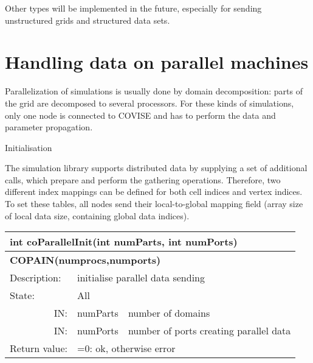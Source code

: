 \begin{htmlonly}
Other types will be implemented in the future, especially for sending unstructured grids and 
structured data sets.




\section{Handling data on parallel machines}
\latexonly
{}
\endlatexonly

Parallelization of simulations is usually done by domain decomposition: parts of the grid are decomposed to several processors. For these kinds of
simulations, only one node is connected to COVISE and has to perform the data and parameter propagation.

\vspace*{1cm}
{\Large Initialisation}
\vspace*{0.5cm}

The simulation library supports distributed data by supplying a set of additional calls, which prepare and perform the gathering operations. Therefore,
two different index mappings can be defined for both cell indices and vertex indices. To set these tables, all nodes send their local-to-global mapping
field (array size of local data size, containing global data indices).


\begin{longtable}{|p{4cm}|p{2.5cm}|p{7cm}|}
\hline
\multicolumn{3}{|p{13.5cm}|}{\bf int coParallelInit(int numParts, int numPorts)}  \\
\hline
\multicolumn{3}{|p{13.5cm}|}{\bf COPAIN(numprocs,numports)}  \\
\hline
\hline
{Description:}  
           & \multicolumn{2}{|p{9.5cm}|}{initialise parallel data sending} \\
\hline
{State:}  & \multicolumn{2}{|p{9.5cm}|}{All } \\
\hline
\multicolumn{1}{|r|}{IN:} & {numParts} 
                          & {number of domains}\\
\hline
\multicolumn{1}{|r|}{IN:} 
       & {numPorts} 
       & {number of ports creating parallel data}\\
\hline
{Return value:}  
  & \multicolumn{2}{|p{9.5cm}|}{=0: ok, otherwise error} \endhead
\hline
\end{longtable}


\end{htmlonly}

